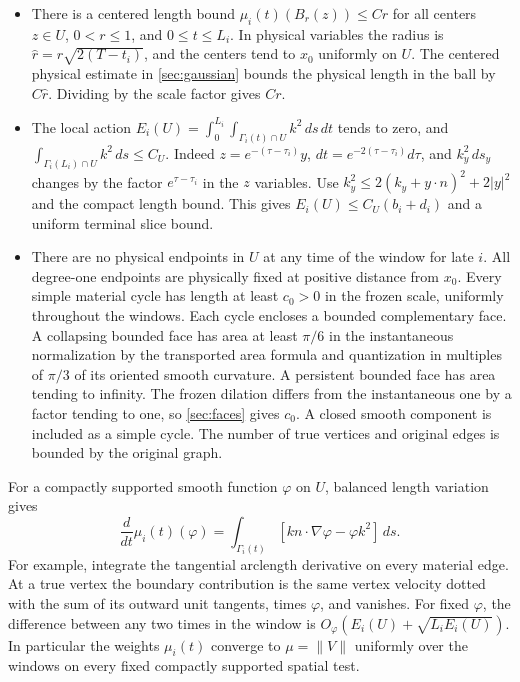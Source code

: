 \begin{itemize}
\tightlist
\item
  There is a centered length bound \(\mu_i(t)(B_r(z))\le C r\) for all centers \(z\in U\), \(0<r\le1\), and \(0\le t\le L_i\). In physical variables the radius is \(\widehat r=r\sqrt{2(T-t_i)}\), and the centers tend to \(x_0\) uniformly on \(U\). The centered physical estimate in \cref{sec:gaussian} bounds the physical length in the ball by \(C\widehat r\). Dividing by the scale factor gives \(Cr\).
\item
  The local action \(E_i(U)=\int_0^{L_i}\int_{\Gamma_i(t)\cap U} k^2\,ds\,dt\) tends to zero, and \(\int_{\Gamma_i(L_i)\cap U}k^2\,ds\le C_U\). Indeed \(z=e^{-(\tau-\tau_i)}y\), \(dt=e^{-2(\tau-\tau_i)}d\tau\), and \(k_y^2\,ds_y\) changes by the factor \(e^{\tau-\tau_i}\) in the \(z\) variables. Use \(k_y^2\le2(k_y+y\cdot n)^2+2|y|^2\) and the compact length bound. This gives \(E_i(U)\le C_U(b_i+d_i)\) and a uniform terminal slice bound.
\item
  There are no physical endpoints in \(U\) at any time of the window for late \(i\). All degree-one endpoints are physically fixed at positive distance from \(x_0\). Every simple material cycle has length at least \(c_0>0\) in the frozen scale, uniformly throughout the windows. Each cycle encloses a bounded complementary face. A collapsing bounded face has area at least \(\pi/6\) in the instantaneous normalization by the transported area formula and quantization in multiples of \(\pi/3\) of its oriented smooth curvature. A persistent bounded face has area tending to infinity. The frozen dilation differs from the instantaneous one by a factor tending to one, so \cref{sec:faces} gives \(c_0\). A closed smooth component is included as a simple cycle. The number of true vertices and original edges is bounded by the original graph.
\end{itemize}

For a compactly supported smooth function \(\varphi\) on \(U\), balanced length variation gives \begin{equation}\label{eq:window-variation}
\frac{d}{dt}\mu_i(t)(\varphi)
 =\int_{\Gamma_i(t)} [k n\cdot\nabla\varphi-\varphi k^2]\,ds.
\end{equation} For example, integrate the tangential arclength derivative on every material edge. At a true vertex the boundary contribution is the same vertex velocity dotted with the sum of its outward unit tangents, times \(\varphi\), and vanishes. For fixed \(\varphi\), the difference between any two times in the window is \(O_\varphi(E_i(U)+\sqrt{L_i E_i(U)})\). In particular the weights \(\mu_i(t)\) converge to \(\mu=\|V\|\) uniformly over the windows on every fixed compactly supported spatial test.

